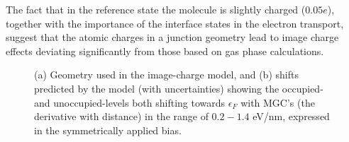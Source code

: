 \documentclass[aip,jcp,a4paper,reprint,floatfix,superscriptaddress]{revtex4-1}
\begin{document}
The fact that in the reference state the molecule is slightly charged ($0.05e$), together with the importance of the interface states in the electron transport, suggest that the atomic charges in a junction geometry lead to image charge effects deviating significantly from those based on gas phase calculations.

\begin{figure}
\caption{
(a) Geometry used in the image-charge model, and (b) shifts predicted by the model (with uncertainties) showing the occupied- and unoccupied-levels both shifting towards $\epsilon_F$ with MGC's (the derivative with distance) in the range of $0.2-1.4$ eV/nm, expressed in the symmetrically applied bias. 
}\label{fg:Shifts}
\end{figure}
\end{document}
